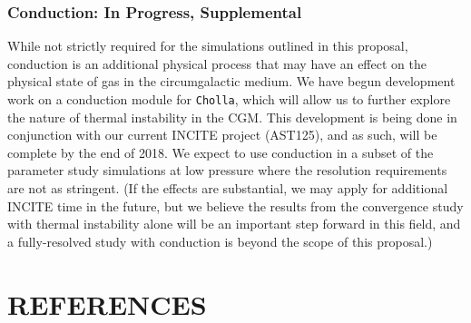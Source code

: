 \documentclass[11pt,letterpaper,english]{article}
\begin{document}
\vspace{-.2in}
\subsubsection{Conduction: In Progress, Supplemental}
\vspace{-.25in}

While not strictly required for the simulations outlined in this proposal, conduction is an additional physical process that may have an effect on the physical state of gas in the circumgalactic medium. We have begun development work on a conduction module for {\tt Cholla}, which will allow us to further explore the nature of thermal instability in the CGM. This development is being done in conjunction with our current INCITE project (AST125), and as such, will be complete by the end of 2018. We expect to use conduction in a subset of the parameter study simulations at low pressure where the resolution requirements are not as stringent. (If the effects are substantial, we may apply for additional INCITE time in the future, but we believe the results from the convergence study with thermal instability alone will be an important step forward in this field, and a fully-resolved study with conduction is beyond the scope of this proposal.)

\vspace{-.3in}
\section{REFERENCES}
\vspace{-.3in}

\end{document}
